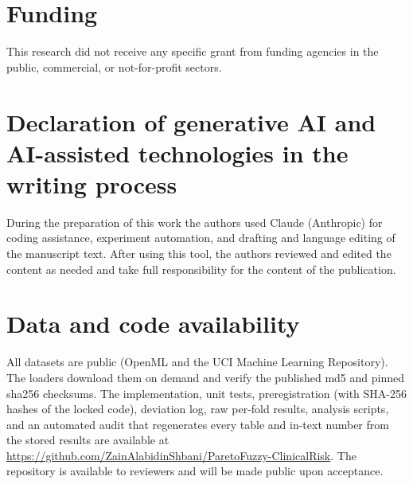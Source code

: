 \documentclass[preprint,12pt]{elsarticle}
\begin{document}
\section*{Funding}
This research did not receive any specific grant from funding agencies in the public,
commercial, or not-for-profit sectors.

\section*{Declaration of generative AI and AI-assisted technologies in the writing process}
During the preparation of this work the authors used Claude (Anthropic) for coding
assistance, experiment automation, and drafting and language editing of the manuscript
text. After using this tool, the authors reviewed and edited the content as needed and take
full responsibility for the content of the publication.

\section*{Data and code availability}
All datasets are public (OpenML and the UCI Machine Learning Repository). The loaders
download them on demand and verify the published md5 and pinned sha256 checksums. The
implementation, unit tests, preregistration (with SHA-256 hashes of the locked code),
deviation log, raw per-fold results, analysis scripts, and an automated audit that
regenerates every table and in-text number from the stored results are available at
\url{https://github.com/ZainAlabidinShbani/ParetoFuzzy-ClinicalRisk}. The repository is
available to reviewers and will be made public upon acceptance.



\end{document}
